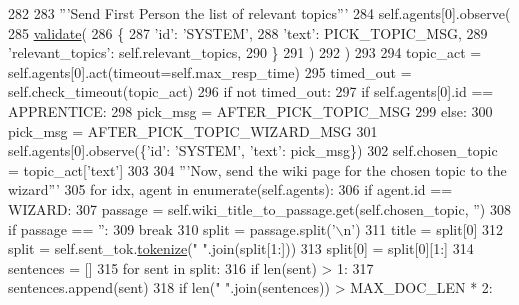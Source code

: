 \begin{DoxyCode}
282 
283             \textcolor{stringliteral}{'''Send First Person the list of relevant topics'''}
284             self.agents[0].observe(
285                 \hyperlink{namespaceparlai_1_1core_1_1worlds_afc3fad603b7bce41dbdc9cdc04a9c794}{validate}(
286                     \{
287                         \textcolor{stringliteral}{'id'}: \textcolor{stringliteral}{'SYSTEM'},
288                         \textcolor{stringliteral}{'text'}: PICK\_TOPIC\_MSG,
289                         \textcolor{stringliteral}{'relevant\_topics'}: self.relevant\_topics,
290                     \}
291                 )
292             )
293 
294             topic\_act = self.agents[0].act(timeout=self.max\_resp\_time)
295             timed\_out = self.check\_timeout(topic\_act)
296             \textcolor{keywordflow}{if} \textcolor{keywordflow}{not} timed\_out:
297                 \textcolor{keywordflow}{if} self.agents[0].id == APPRENTICE:
298                     pick\_msg = AFTER\_PICK\_TOPIC\_MSG
299                 \textcolor{keywordflow}{else}:
300                     pick\_msg = AFTER\_PICK\_TOPIC\_WIZARD\_MSG
301                 self.agents[0].observe(\{\textcolor{stringliteral}{'id'}: \textcolor{stringliteral}{'SYSTEM'}, \textcolor{stringliteral}{'text'}: pick\_msg\})
302             self.chosen\_topic = topic\_act[\textcolor{stringliteral}{'text'}]
303 
304             \textcolor{stringliteral}{'''Now, send the wiki page for the chosen topic to the wizard'''}
305             \textcolor{keywordflow}{for} idx, agent \textcolor{keywordflow}{in} enumerate(self.agents):
306                 \textcolor{keywordflow}{if} agent.id == WIZARD:
307                     passage = self.wiki\_title\_to\_passage.get(self.chosen\_topic, \textcolor{stringliteral}{''})
308                     \textcolor{keywordflow}{if} passage == \textcolor{stringliteral}{''}:
309                         \textcolor{keywordflow}{break}
310                     split = passage.split(\textcolor{stringliteral}{'\(\backslash\)n'})
311                     title = split[0]
312                     split = self.sent\_tok.\hyperlink{namespaceparlai_1_1agents_1_1tfidf__retriever_1_1build__tfidf_a1fdb457e98eb4e4c26047e229686a616}{tokenize}(\textcolor{stringliteral}{" "}.join(split[1:]))
313                     split[0] = split[0][1:]
314                     sentences = []
315                     \textcolor{keywordflow}{for} sent \textcolor{keywordflow}{in} split:
316                         \textcolor{keywordflow}{if} len(sent) > 1:
317                             sentences.append(sent)
318                             \textcolor{keywordflow}{if} len(\textcolor{stringliteral}{" "}.join(sentences)) > MAX\_DOC\_LEN * 2:

\end{DoxyCode}
